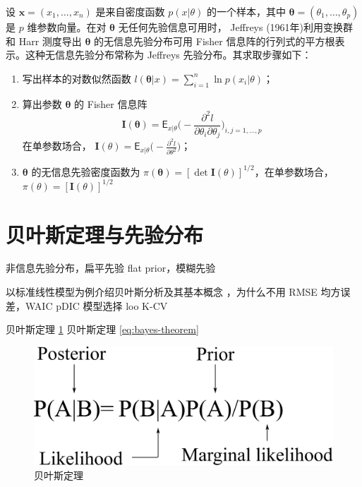 \documentclass[12pt,a4paper,UTF8,twoside]{book}
\providecommand{\tightlist}{%
  \setlength{\itemsep}{0pt}\setlength{\parskip}{0pt}}
\theoremstyle{definition}
\theoremstyle{definition}
\theoremstyle{definition}
\theoremstyle{remark}
\begin{document}
设 \(\mathbf{x} = (x_1,\ldots,x_n)\) 是来自密度函数 \(p(x|\theta)\)
的一个样本，其中 \(\boldsymbol{\theta} = (\theta_1,\ldots,\theta_p)\) 是
\(p\) 维参数向量。在对 \(\boldsymbol{\theta}\) 无任何先验信息可用时，
Jeffreys (1961年)利用变换群和 Harr 测度导出 \(\boldsymbol{\theta}\)
的无信息先验分布可用 Fisher
信息阵的行列式的平方根表示。这种无信息先验分布常称为 Jeffreys
先验分布。其求取步骤如下：

\begin{enumerate}
\def\labelenumi{\arabic{enumi}.}
\tightlist
\item
  写出样本的对数似然函数
  \(l(\boldsymbol{\theta}|x) = \sum_{i=1}^{n}\ln p(x_i | \theta)\)；
\item
  算出参数 \(\boldsymbol{\theta}\) 的 Fisher 信息阵
  \[\mathbf{I}(\boldsymbol{\theta}) = \mathsf{E}_{x|\theta} \big( - \frac{\partial^2 l}{\partial \theta_i \partial \theta_j} \big)_{i,j=1,\ldots,p}\]
  在单参数场合，
  \(\mathbf{I}(\theta) = \mathsf{E}_{x|\theta} \big( - \frac{\partial^2 l}{\partial \theta^2} \big)\)；
\item
  \(\boldsymbol{\theta}\) 的无信息先验密度函数为
  \(\pi(\boldsymbol{\theta}) = [\det \mathbf{I}(\theta) ]^{1/2}\)，在单参数场合，
  \(\pi(\theta) = [\mathbf{I}(\theta) ]^{1/2}\)
\end{enumerate}

\hypertarget{bayes-methods}{%
\section{贝叶斯定理与先验分布}\label{bayes-methods}}

{非信息先验分布，扁平先验 flat prior，模糊先验}

以标准线性模型为例介绍贝叶斯分析及其基本概念
\citep{Rasmussen2006}，为什么不用 RMSE 均方误差，WAIC pDIC 模型选择 loo
K-CV

贝叶斯定理 \ref{fig:bayes-theorem} 贝叶斯定理 \eqref{eq:bayes-theorem}

\begin{figure}

{\centering \includegraphics[width=0.7\linewidth]{figures/bayes-theorem} 

}

\caption{贝叶斯定理}\label{fig:bayes-theorem}
\end{figure}
\end{document}
